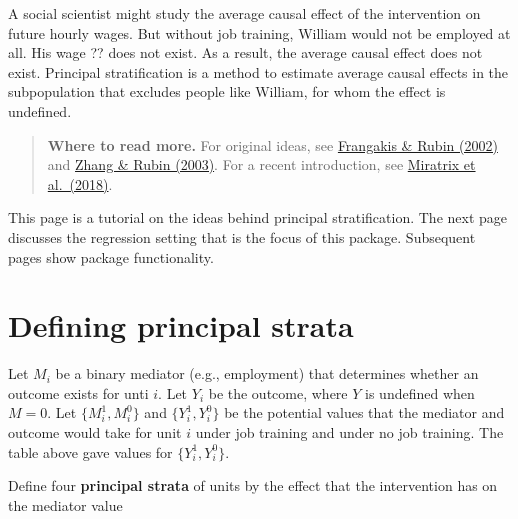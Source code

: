 \documentclass[
]{book}
\begin{document}
A social scientist might study the average causal effect of the intervention on future hourly wages. But without job training, William would not be employed at all. His wage ?? does not exist. As a result, the average causal effect does not exist. Principal stratification is a method to estimate average causal effects in the subpopulation that excludes people like William, for whom the effect is undefined.

\begin{quote}
\textbf{Where to read more.} For original ideas, see \href{https://doi.org/10.1111/j.0006-341X.2002.00021.x}{Frangakis \& Rubin (2002)} and \href{https://doi.org/10.3102/10769986028004353}{Zhang \& Rubin (2003)}. For a recent introduction, see \href{https://doi.org/10.1080/19345747.2017.1379576}{Miratrix et al.~(2018)}.
\end{quote}

This page is a tutorial on the ideas behind principal stratification. The next page discusses the regression setting that is the focus of this package. Subsequent pages show package functionality.

\hypertarget{defining-principal-strata}{%
\section{Defining principal strata}\label{defining-principal-strata}}

Let \(M_i\) be a binary mediator (e.g., employment) that determines whether an outcome exists for unti \(i\). Let \(Y_i\) be the outcome, where \(Y\) is undefined when \(M = 0\). Let \(\{M_i^1,M_i^0\}\) and \(\{Y_i^1,Y_i^0\}\) be the potential values that the mediator and outcome would take for unit \(i\) under job training and under no job training. The table above gave values for \(\{Y_i^1,Y_i^0\}\).

Define four \textbf{principal strata} of units by the effect that the intervention has on the mediator value
\end{document}
